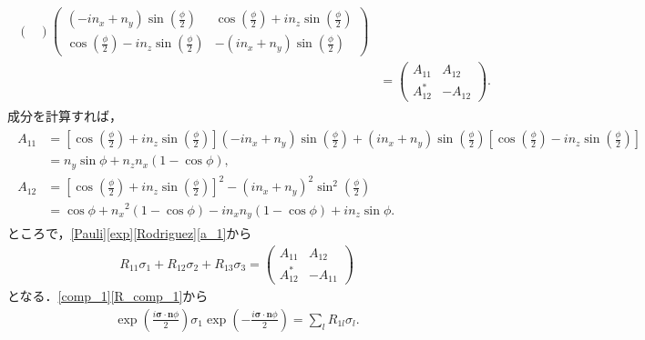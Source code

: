 \documentclass[a4paper]{ltjsreport}
\begin{document}
\begin{align}
\begin{split}
\begin{pmatrix}
    \end{pmatrix}
    \begin{pmatrix}
      (-in_x+n_y)\sin\left(\frac{\phi}{2}\right) & \cos\left(\frac{\phi}{2}\right)+in_z\sin\left(\frac{\phi}{2}\right)\\
      \cos\left(\frac{\phi}{2}\right)-in_z\sin\left(\frac{\phi}{2}\right) & -(in_x+n_y)\sin\left(\frac{\phi}{2}\right)
    \end{pmatrix}
    \\
    & =
    \begin{pmatrix}
      A_{11} & A_{12}\\
      A_{12}^* & -A_{12}
    \end{pmatrix}
    .
  \end{split}
  \label{comp_1}
\end{align}
成分を計算すれば，
\begin{align}
  \begin{split}
    A_{11} & = \left[\cos\left(\frac{\phi}{2}\right)+in_z\sin\left(\frac{\phi}{2}\right)\right](-in_x+n_y)\sin\left(\frac{\phi}{2}\right)+(in_x+n_y)\sin\left(\frac{\phi}{2}\right)\left[\cos\left(\frac{\phi}{2}\right)-in_z\sin\left(\frac{\phi}{2}\right)\right]\\
    & = n_y\sin\phi+n_zn_x(1-\cos\phi),\\
    A_{12} & = \left[\cos\left(\frac{\phi}{2}\right)+in_z\sin\left(\frac{\phi}{2}\right)\right]^2-(in_x+n_y)^2\sin^2\left(\frac{\phi}{2}\right)\\
    & = \cos\phi+n_x{}^2(1-\cos\phi)-in_xn_y(1-\cos\phi)+in_z\sin\phi.
  \end{split}
  \label{a_1}
\end{align}
ところで，\eqref{Pauli}\eqref{exp}\eqref{Rodriguez}\eqref{a_1}から
\begin{align}
  R_{11}\sigma_1+R_{12}\sigma_2+R_{13}\sigma_3 =
  \begin{pmatrix}
    A_{11} & A_{12}\\
    A_{12}^* & -A_{11}
  \end{pmatrix}
  \label{R_comp_1}
\end{align}
となる．\eqref{comp_1}\eqref{R_comp_1}から
\begin{align}
  \exp\left(\frac{i\boldsymbol{\sigma}\cdot\boldsymbol{n}\phi}{2}\right)\sigma_1\exp\left(-\frac{i\boldsymbol{\sigma}\cdot\boldsymbol{n}\phi}{2}\right)=\sum_lR_{1l}\sigma_l.\label{result_1}
\end{align}
\end{document}

